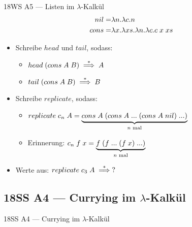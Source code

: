 \documentclass{beamer}
\begin{document}
\begin{frame}{18WS A5 --- Listen im $\lambda$-Kalkül}
	\begin{eqnarray*}
		nil  =& \lambda{}n.\lambda{}c.n \\
		cons =& \lambda{}x.\lambda{}xs.\lambda{}n.\lambda{}c.c\;{}x\;{}xs
	\end{eqnarray*}

	\begin{itemize}
		\item Schreibe $head$ und $tail$, sodass:
		\begin{itemize}
			\item $head\;{}(cons\;{}A\;{}B) \stackrel{*}{\implies} A$
			\item $tail\;{}(cons\;{}A\;{}B) \stackrel{*}{\implies} B$
		\end{itemize}
		\pause
		\item Schreibe $replicate$, sodass:
		\begin{itemize}
			\item $replicate\;{}c_n\;{}A = \underbrace{cons\;{}A\;{}(cons\;{}A\;{}...\;{}(cons\;{}A\;{}nil)\;{}...)}_\text{$n$ mal}$
			\item Erinnerung: $c_n\;{}f\;{}x = \underbrace{f\;{}(f\;{}...\;{}(f\;{}x)\;{}...)}_\text{$n$ mal}$
		\end{itemize}
		\pause
		\item Werte aus: $replicate\;{}c_3\;{}A \stackrel{*}{\implies} ?$
	\end{itemize}
\end{frame}

\subsection{18SS A4 --- Currying im $\lambda$-Kalkül}

\begin{frame}{18SS A4 --- Currying im $\lambda$-Kalkül}
\end{frame}
\end{document}

